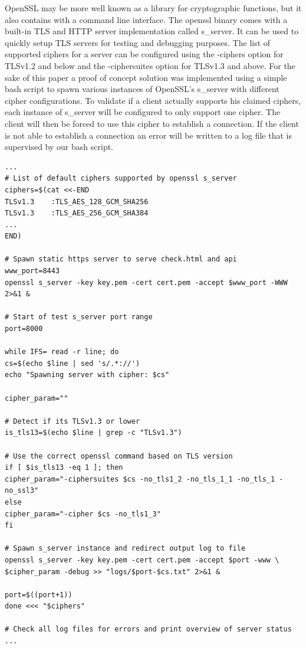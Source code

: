 \documentclass[12pt]{scrbook}
\begin{document}
OpenSSL may be more well known as a library for cryptographic functions, but it
also contains with a command line interface. The openssl binary comes with a
built-in TLS and HTTP server implementation called s\_server. It can be used to
quickly setup TLS servers for testing and debugging purposes. The list of
supported ciphers for a server can be configured using the -ciphers option for
TLSv1.2 and below and the -ciphersuites option for TLSv1.3 and above. For the
sake of this paper a proof of concept solution was implemented using a simple
bash script to spawn various instances of OpenSSL's s\_server with different
cipher configurations. To validate if a client actually supports his claimed
ciphers, each instance of s\_server will be configured to only support one
cipher. The client will then be forced to use this cipher to establish a
connection. If the client is not able to establish a connection an error will be
written to a log file that is supervised by our bash script.

\begin{verbatim}
...
# List of default ciphers supported by openssl s_server
ciphers=$(cat <<-END
TLSv1.3    :TLS_AES_128_GCM_SHA256
TLSv1.3    :TLS_AES_256_GCM_SHA384
...
END)

# Spawn static https server to serve check.html and api
www_port=8443
openssl s_server -key key.pem -cert cert.pem -accept $www_port -WWW 2>&1 &

# Start of test s_server port range
port=8000

while IFS= read -r line; do
cs=$(echo $line | sed 's/.*://')
echo "Spawning server with cipher: $cs"

cipher_param=""

# Detect if its TLSv1.3 or lower
is_tls13=$(echo $line | grep -c "TLSv1.3")

# Use the correct openssl command based on TLS version
if [ $is_tls13 -eq 1 ]; then
cipher_param="-ciphersuites $cs -no_tls1_2 -no_tls_1_1 -no_tls_1 -no_ssl3"
else
cipher_param="-cipher $cs -no_tls1_3"
fi

# Spawn s_server instance and redirect output log to file
openssl s_server -key key.pem -cert cert.pem -accept $port -www \
$cipher_param -debug >> "logs/$port-$cs.txt" 2>&1 &

port=$((port+1))
done <<< "$ciphers"

# Check all log files for errors and print overview of server status ...
\end{verbatim}

\newpage
\end{document}

